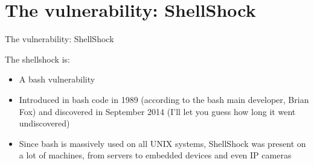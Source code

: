 \documentclass[11pt]{beamer}
\begin{document}
\section{The vulnerability: ShellShock}
\begin{frame}{The vulnerability: ShellShock}
\noindent
 \parbox[t]{8cm}{
The shellshock is: 
\begin{itemize}
\item A bash vulnerability
\item Introduced in bash code in 1989 (according to the bash main developer, Brian Fox) and discovered in September 2014 (I'll let you guess how long it went undiscovered)
\item Since bash is massively used on all UNIX systems, ShellShock was present on a lot of machines, from servers to embedded devices and even IP cameras
\end{itemize}}
     \hfill
\end{frame}
\end{document}
